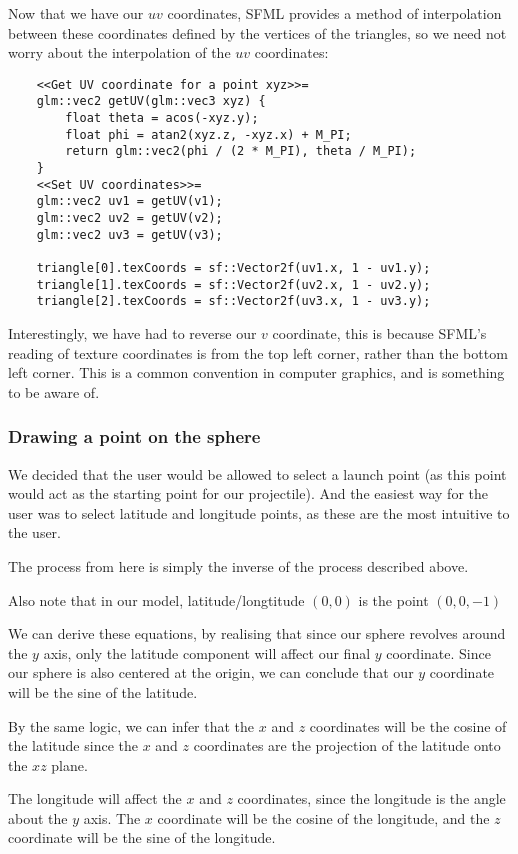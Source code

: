\documentclass[main.tex]{subfiles}
\begin{document}
Now that we have our $uv$ coordinates, SFML provides a method of interpolation between these coordinates defined by the vertices of the triangles, so 
we need not worry about the interpolation of the $uv$ coordinates:
\begin{lstlisting}
    <<Get UV coordinate for a point xyz>>=
    glm::vec2 getUV(glm::vec3 xyz) {
        float theta = acos(-xyz.y);
        float phi = atan2(xyz.z, -xyz.x) + M_PI;
        return glm::vec2(phi / (2 * M_PI), theta / M_PI);
    }
    <<Set UV coordinates>>=
    glm::vec2 uv1 = getUV(v1);
    glm::vec2 uv2 = getUV(v2);
    glm::vec2 uv3 = getUV(v3);

    triangle[0].texCoords = sf::Vector2f(uv1.x, 1 - uv1.y);
    triangle[1].texCoords = sf::Vector2f(uv2.x, 1 - uv2.y);
    triangle[2].texCoords = sf::Vector2f(uv3.x, 1 - uv3.y);

\end{lstlisting}
Interestingly, we have had to reverse our $v$ coordinate, this is because SFML's reading of
texture coordinates is from the top left corner, rather than the bottom left corner. This is a common convention in computer graphics, and is something to be aware of.

\subsubsection{Drawing a point on the sphere}
We decided that the user would be allowed to select a launch point (as this point would act as the starting point for our projectile). 
And the easiest way for the user was to select latitude and longitude points, as these are the most intuitive to the user.

The process from here is simply the inverse of the process described above.

Also note that in our model, latitude/longtitude $(0, 0)$ is the point $(0, 0, -1)$ 

We can derive these equations, by realising that since our sphere revolves around the $y$ axis,
only the latitude component will affect our final $y$ coordinate. Since our sphere is also 
centered at the origin, we can conclude that our $y$ coordinate will be the sine of the latitude.

By the same logic, we can infer that the $x$ and $z$ coordinates will be the cosine of the latitude
since the $x$ and $z$ coordinates are the projection of the latitude onto the $xz$ plane.

The longitude will affect the $x$ and $z$ coordinates, since the longitude is the angle about the $y$ axis.
The $x$ coordinate will be the cosine of the longitude, and the $z$ coordinate will be the sine of the longitude.
\end{document}
